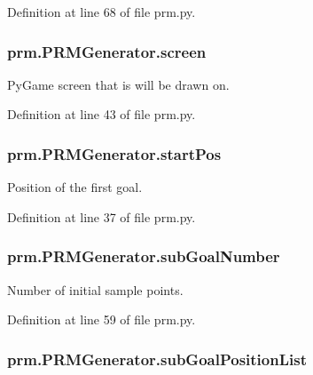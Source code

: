 Definition at line 68 of file prm.\-py.

\hypertarget{classprm_1_1PRMGenerator_ab7fc7e3fa902029c3c3432ec0444be93}{
\subsubsection[{screen}]{\setlength{\rightskip}{0pt plus 5cm}prm.\-P\-R\-M\-Generator.\-screen}}\label{classprm_1_1PRMGenerator_ab7fc7e3fa902029c3c3432ec0444be93}


Py\-Game screen that is will be drawn on. 



Definition at line 43 of file prm.\-py.

\hypertarget{classprm_1_1PRMGenerator_a784ce423bc47ebc7a09632948eb903eb}{
\subsubsection[{start\-Pos}]{\setlength{\rightskip}{0pt plus 5cm}prm.\-P\-R\-M\-Generator.\-start\-Pos}}\label{classprm_1_1PRMGenerator_a784ce423bc47ebc7a09632948eb903eb}


Position of the first goal. 



Definition at line 37 of file prm.\-py.

\hypertarget{classprm_1_1PRMGenerator_af8d162e83184c5493019e868e53fcefd}{
\subsubsection[{sub\-Goal\-Number}]{\setlength{\rightskip}{0pt plus 5cm}prm.\-P\-R\-M\-Generator.\-sub\-Goal\-Number}}\label{classprm_1_1PRMGenerator_af8d162e83184c5493019e868e53fcefd}


Number of initial sample points. 



Definition at line 59 of file prm.\-py.

\hypertarget{classprm_1_1PRMGenerator_a6c5a8c95cfb4636e37404d2f2dce78f8}{
\subsubsection[{sub\-Goal\-Position\-List}]{\setlength{\rightskip}{0pt plus 5cm}prm.\-P\-R\-M\-Generator.\-sub\-Goal\-Position\-List}}\label{classprm_1_1PRMGenerator_a6c5a8c95cfb4636e37404d2f2dce78f8}


